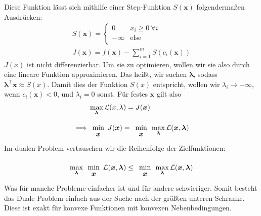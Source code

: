 \documentclass{report}
\renewcommand{\min}[1] {
    \begin{array}{c}
        \vphantom{#1}\\[-3pt] %
        \text{min}\\[-3pt]
        #1\\
        \end{array}
    }
\begin{document}
Diese Funktion lässt sich mithilfe einer Step-Funktion $S(\bm{x})$ folgendermaßen Ausdrücken:
\begin{align*}
 S(\bm{x}) = \begin{cases}
              0 & x_i \geq 0\ \forall i\\
              -\infty & \text{else}\\
             \end{cases}\\
J(\bm{x}) = f(\bm{x}) - \sum_{i=1}^{m}S(c_i(\bm{x}))
\end{align*}
$J(x)$ ist nicht differenzierbar. Um sie zu optimieren, wollen wir sie also durch eine lineare Funktion approximieren. Das heißt, wir   suchen $\bm{\lambda}$, sodass $\bm{\lambda}^\top \bm{x} \approx S(x)$. Damit dies der Funktion $S(x)$ entspricht, wollen wir $\lambda_i \to -\infty$, wenn $c_i(\bm{x}) < 0$, und $\lambda_i = 0$ sonst. Für festes $\bm{x}$ gilt also
\begin{align*}
 &\max_{\bm{\lambda}} \mathcal{L}(x, \lambda) = J(\bm{x})\\
 \implies &\min{\bm{x}} J(\bm{x}) = \min{\bm{x}}\max_{\bm{\lambda}} \mathcal{L}(\bm{x}, \bm{\lambda})
\end{align*}
Im dualen Problem vertauschen wir die Reihenfolge der Zielfunktionen:
\begin{align*}
 \max_{\bm{\lambda}} \min{\bm{x}} \mathcal{L}(\bm{x}, \bm{\lambda}) \leq \min{\bm{x}}  \max_{\bm{\lambda}} \mathcal{L}(\bm{x}, \bm{\lambda})
\end{align*}
Was für manche Probleme einfacher ist und für andere schwieriger. Somit besteht das Duale Problem einfach aus der Suche nach der größten unteren Schranke. Diese ist exakt für konvexe Funktionen mit konvexen Nebenbedingungen.
\fi
\end{document}

